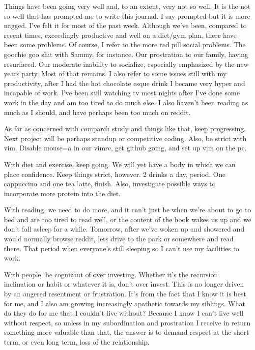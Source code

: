 Things have been going very well and, to an extent, very not so well. It
is the not so well that has prompted me to write this journal. I say
prompted but it is more nagged. I've felt it for most of the past week.
Although we've been, compared to recent times, exceedingly productive
and well on a diet/gym plan, there have been some problems. Of course, I
refer to the more red pill social problems. The goochie goo shit with
Sammy, for instance. Our prostration to our family, having resurfaced.
Our moderate inability to socialize, especially emphasized by the new
years party. Most of that remains. I also refer to some issues still
with my productivity, after I had the hot chocolate esque drink I became
very hyper and incapable of work. I've been still watching tv most
nights after I've done some work in the day and am too tired to do much
else. I also haven't been reading as much as I should, and have perhaps
been too much on reddit.

\qquad As far as concerned with comparch study and things like that,
keep progressing. Next project will be perhaps standup or competitive
coding. Also, be strict with vim. Disable mouse=a in our vimrc, get
github going, and set up vim on the pc.

\qquad With diet and exercise, keep going. We will yet have a body in
which we can place confidence. Keep things strict, however. 2 drinks a
day, period. One cappuccino and one tea latte, finish. Also, investigate
possible ways to incorporate more protein into the diet.

\qquad With reading, we need to do more, and it can't just be when we're
about to go to bed and are too tired to read well, or the content of the
book wakes us up and we don't fall asleep for a while. Tomorrow, after
we've woken up and showered and would normally browse reddit, lets drive
to the park or somewhere and read there. That period when everyone's
still sleeping so I can't use my facilities to work.

\qquad With people, be cognizant of over investing. Whether it's the
recursion inclination or habit or whatever it is, don't over invest.
This is no longer driven by an angered resentment or frustration. It's
from the fact that I know it is best for me, and I also am growing
increasingly apathetic towards my siblings. What do they do for me that
I couldn't live without? Because I know I can't live well without
respect, so unless in my subordination and prostration I receive in
return something more valuable than that, the answer is to demand
respect at the short term, or even long term, loss of the relationship.

